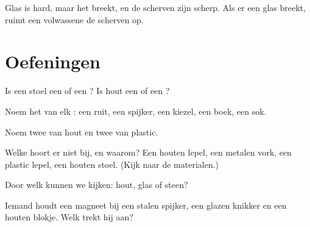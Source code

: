 \begin{remark}\label{rem:g1:materials-around-us:glass}
Glas is hard, maar het breekt, en de scherven zijn scherp. Als er een
glas breekt, ruimt een volwassene de scherven op.
\end{remark}

\section{Oefeningen}

\begin{exercise}[$\star$]\label{exo:g1:materials-around-us:1}
Is een stoel een  of een ? Is hout een  of een
?
\end{exercise}

\begin{exercise}[$\star$]\label{exo:g1:materials-around-us:2}
Noem het  van elk : een ruit, een spijker, een kiezel,
een boek, een sok.
\end{exercise}

\begin{exercise}[$\star$]\label{exo:g1:materials-around-us:3}
Noem twee  van hout en twee  van plastic.
\end{exercise}

\begin{exercise}[$\star$]\label{exo:g1:materials-around-us:4}
Welke hoort er niet bij, en waarom? Een houten lepel, een metalen vork,
een plastic lepel, een houten stoel. (Kijk naar de materialen.)
\end{exercise}

\begin{exercise}[$\star$]\label{exo:g1:materials-around-us:5}
Door welk  kunnen we kijken: hout, glas of steen?
\end{exercise}

\begin{exercise}[$\star$]\label{exo:g1:materials-around-us:6}
Iemand houdt een magneet bij een stalen spijker, een glazen knikker en
een houten blokje. Welk  trekt hij aan?
\end{exercise}

